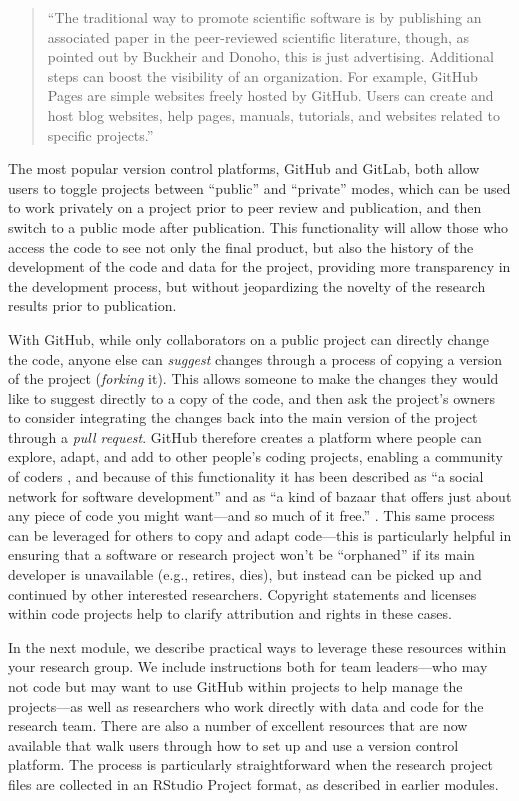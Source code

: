 \documentclass[]{tufte-book}
\begin{document}
\begin{quote}
``The traditional way to promote scientific software is by publishing an
associated paper in the peer-reviewed scientific literature, though, as pointed
out by Buckheir and Donoho, this is just advertising. Additional steps can boost
the visibility of an organization. For example, GitHub Pages are simple websites
freely hosted by GitHub. Users can create and host blog websites, help pages,
manuals, tutorials, and websites related to specific projects.'' \citep{perez2016ten}
\end{quote}

The most popular version control platforms, GitHub and GitLab, both allow users
to toggle projects between ``public'' and ``private'' modes, which can be used to
work privately on a project prior to peer review and publication, and then
switch to a public mode after publication. This functionality will allow those
who access the code to see not only the final product, but also the history of
the development of the code and data for the project, providing more
transparency in the development process, but without jeopardizing the novelty of
the research results prior to publication.

With GitHub, while only collaborators on a public project can directly change
the code, anyone else can \emph{suggest} changes through a process of copying a
version of the project (\emph{forking} it). This allows someone to make the changes
they would like to suggest directly to a copy of the code, and then ask the
project's owners to consider integrating the changes back into the main version
of the project through a \emph{pull request}. GitHub therefore creates a platform
where people can explore, adapt, and add to other people's coding projects,
enabling a community of coders \citep{perez2016ten}, and because of this
functionality it has been described as ``a social network for software
development'' \citep{perkel2018git} and as ``a kind of bazaar that offers just about
any piece of code you might want---and so much of it free.'' \citep{metz2015github}.
This same process can be leveraged for others to copy and adapt code---this is
particularly helpful in ensuring that a software or research project won't be
``orphaned'' if its main developer is unavailable (e.g., retires, dies), but
instead can be picked up and continued by other interested researchers.
Copyright statements and licenses within code projects help to clarify
attribution and rights in these cases.

In the next module, we describe practical ways to leverage these resources
within your research group. We include instructions both for team leaders---who
may not code but may want to use GitHub within projects to help manage the
projects---as well as researchers who work directly with data and code for the
research team. There are also a number of excellent resources that are now
available that walk users through how to set up and use a version control
platform. The process is particularly straightforward when the research project
files are collected in an RStudio Project format, as described in earlier
modules.
\end{document}
